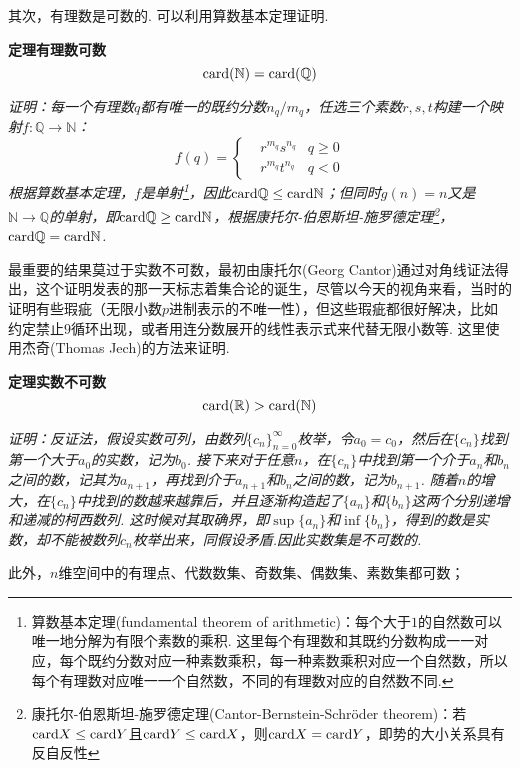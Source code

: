 \documentclass[UTF8]{ctexart}
\newcommand{\trm}[1]{{\rm #1}}
\newcommand{\card}{{\rm card}}
\newenvironment{theorem}[1]
    {\begin{tcolorbox}[enhanced, colback=LightYellow, breakable=true, frame hidden, borderline west={1.5mm}{-2mm}{DarkBlue}]
    {\bfseries {\color{DarkBlue} 定理}\quad #1} \newline}
    {\end{tcolorbox}}
\begin{document}
其次，有理数是可数的. 可以利用算数基本定理证明.
\begin{theorem}{有理数可数}
    \[\trm{card}(\mathbb{N})=\trm{card}(\mathbb{Q})\]
\end{theorem}
\textit{
    证明：每一个有理数\(q\)都有唯一的既约分数\(n_q/m_q\)，任选三个素数\(r,s,t\)构建一个映射\(f:\mathbb{Q} \to \mathbb{N}\)：
    \[f(q) = \left\{ \begin{aligned} & r^{m_q}s^{n_q} & q \geq 0 \\ & r^{m_q}t^{n_q} & q < 0 \end{aligned}\right.\]
    根据算数基本定理，\(f\)是单射\footnote{算数基本定理(fundamental theorem of arithmetic)：每个大于\(1\)的自然数可以唯一地分解为有限个素数的乘积. 这里每个有理数和其既约分数构成一一对应，每个既约分数对应一种素数乘积，每一种素数乘积对应一个自然数，所以每个有理数对应唯一一个自然数，不同的有理数对应的自然数不同.}，因此\(\card{\mathbb{Q}} \leq \card{\mathbb{N}}\)；但同时\(g(n)=n\)又是\(\mathbb{N} \to \mathbb{Q}\)的单射，即\(\card{\mathbb{Q}} \geq \card{\mathbb{N}}\)，根据康托尔-伯恩斯坦-施罗德定理\footnote{康托尔-伯恩斯坦-施罗德定理(Cantor-Bernstein-Schröder theorem)：若\(\card{X} \leq \card{Y}\)且\(\card{Y} \leq \card{X}\)，则\(\card{X} = \card{Y}\)，即势的大小关系具有反自反性}，\(\card{\mathbb{Q}} = \card{\mathbb{N}}\).
}

最重要的结果莫过于实数不可数，最初由康托尔(Georg Cantor)通过对角线证法得出，这个证明发表的那一天标志着集合论的诞生，尽管以今天的视角来看，当时的证明有些瑕疵（无限小数\(p\)进制表示的不唯一性），但这些瑕疵都很好解决，比如约定禁止\(9\)循环出现，或者用连分数展开的线性表示式来代替无限小数等. 这里使用杰奇(Thomas Jech)的方法来证明.

\begin{theorem}{实数不可数}
    \[\trm{card}(\mathbb{R})>\trm{card}(\mathbb{N})\]
\end{theorem}
\textit{
    证明：反证法，假设实数可列，由数列\(\{c_n\}_{n=0}^{\infty}\)枚举，令\(a_0=c_0\)，然后在\(\{c_n\}\)找到第一个大于\(a_0\)的实数，记为\(b_0\). 接下来对于任意\(n\)，在\(\{c_n\}\)中找到第一个介于\(a_n\)和\(b_n\)之间的数，记其为\(a_{n+1}\)，再找到介于\(a_{n+1}\)和\(b_n\)之间的数，记为\(b_{n+1}\). 随着\(n\)的增大，在\(\{c_n\}\)中找到的数越来越靠后，并且逐渐构造起了\(\{a_n\}\)和\(\{b_n\}\)这两个分别递增和递减的柯西数列. 这时候对其取确界，即\(\sup\{a_n\}\)和\(\inf\{b_n\}\)，得到的数是实数，却不能被数列\(c_n\)枚举出来，同假设矛盾.因此实数集是不可数的.
}

此外，\(n\)维空间中的有理点、代数数集、奇数集、偶数集、素数集都可数；
\end{document}
